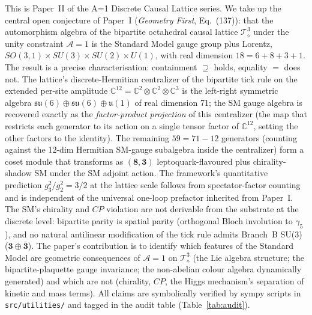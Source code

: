 This is Paper~II of the A=1 Discrete Causal Lattice series.  We take
up the central open conjecture of Paper~I (\emph{Geometry First},
Eq.~(137)): that the automorphism algebra of the bipartite
octahedral causal lattice $\mathcal{T}_\diamond^3$ under the unity
constraint $\mathcal{A}=1$ is the Standard Model gauge group plus
Lorentz, $SO(3,1) \times SU(3) \times SU(2) \times U(1)$, with real
dimension $18 = 6+8+3+1$.  The result is a precise
characterisation: containment $\supseteq$ holds, equality $=$
does not.  The lattice's discrete-Hermitian centralizer of the
bipartite tick rule on the extended per-site amplitude
$\mathbb{C}^{12} = \mathbb{C}^2 \otimes \mathbb{C}^2 \otimes
\mathbb{C}^3$ is the left-right symmetric algebra $\mathfrak{su}(6)
\oplus \mathfrak{su}(6) \oplus \mathfrak{u}(1)$ of real dimension
71; the SM gauge algebra is recovered exactly as the
\emph{factor-product projection} of this centralizer (the map that
restricts each generator to its action on a single tensor factor
of $\mathbb{C}^{12}$, setting the other factors to the identity).  The remaining $59 = 71 - 12$ generators (counting against the 12-dim Hermitian SM-gauge subalgebra inside the centralizer) form a coset module that
transforms as $(\mathbf{8}, \mathbf{3})$ leptoquark-flavoured plus
chirality-shadow SM under the SM adjoint action.  The framework's
quantitative prediction $g_3^2 / g_2^2 = 3/2$ at the lattice
scale follows from spectator-factor counting and is independent
of the universal one-loop prefactor inherited from Paper~I.  The
SM's chirality and $CP$ violation are not derivable from the
substrate at the discrete level: bipartite parity is spatial
parity (orthogonal Bloch involution to $\gamma_5$), and no natural
antilinear modification of the tick rule admits Branch~B SU(3)
($\mathbf{3} \oplus \bar{\mathbf{3}}$).  The paper's contribution
is to identify which features of the Standard Model are geometric
consequences of $\mathcal{A}=1$ on $\mathcal{T}_\diamond^3$ (the
Lie algebra structure; the bipartite-plaquette gauge invariance;
the non-abelian colour algebra dynamically generated) and which
are not (chirality, $CP$, the Higgs mechanism's separation of
kinetic and mass terms).  All claims are symbolically verified by
sympy scripts in \nolinkurl{src/utilities/} and tagged in the
audit table (Table~\ref{tab:audit}).
